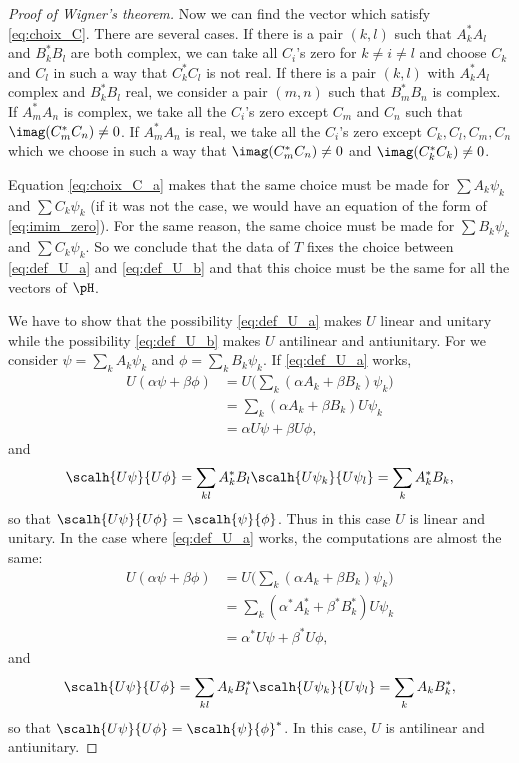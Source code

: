 \begin{proof}[Proof of Wigner's theorem]
	Now we can find the vector which satisfy \eqref{eq:choix_C}. There are several cases. If there is a pair $(k,l)$ such that $A^*_kA_l$ and $B^*_kB_l$ are both complex, we can take all $C_i$'s zero for $k\neq i\neq l$ and choose $C_k$ and $C_l$ in such a way that $C^*_kC_l$ is not real. If there is a pair $(k,l)$ with $A^*_kA_l$ complex and $B^*_kB_l$ real, we consider a pair $(m,n)$ such that $B^*_mB_n$ is complex. If $A^*_mA_n$ is complex, we take all the $C_i$'s zero except $C_m$ and $C_n$ such that $\imag(C^*_mC_n)\neq 0$. If $A^*_mA_n$ is real, we take all the $C_i$'s zero except $C_k,C_l,C_m,C_n$ which we choose in such a way that $\imag(C^*_mC_n)\neq 0$ and $\imag(C^*_kC_k)\neq 0$.

	Equation \eqref{eq:choix_C_a} makes that the same choice must be made for $\sum A_k\psi_k$ and $\sum C_k\psi_k$ (if it was not the case, we would have an equation of the form of \eqref{eq:imim_zero}). For the same reason, the same choice must be made for $\sum B_k\psi_k$ and $\sum C_k\psi_k$. So we conclude that the data of $T$ fixes the choice between \eqref{eq:def_U_a} and \eqref{eq:def_U_b} and that this choice must be the same for all the vectors of $\pH$.

	We have to show that the possibility \eqref{eq:def_U_a} makes $U$ linear and unitary while the possibility \eqref{eq:def_U_b} makes $U$ antilinear and antiunitary. For we consider $\psi=\sum_k A_k\psi_k$ and $\phi=\sum_k B_k\psi_k$. If \eqref{eq:def_U_a} works,
	\begin{equation}
		\begin{split}
			U(\alpha\psi+\beta\phi)&=U\Big(  \sum_k(\alpha A_k+\beta B_k)\psi_k     \Big)\\
			&=\sum_k(\alpha A_k+\beta B_k)U\psi_k\\
			&=\alpha U\psi+\beta U\phi,
		\end{split}
	\end{equation}
	and
	\begin{equation}
		\scalh{U\psi}{U\phi}=\sum_{kl}A^*_kB_l\scalh{U\psi_k}{U\psi_l}=\sum_kA^*_kB_k,
	\end{equation}
	so that $\scalh{U\psi}{U\phi}=\scalh{\psi}{\phi}$. Thus in this case $U$ is linear and unitary. In the case where \eqref{eq:def_U_a} works, the computations are almost the same:
	\begin{equation}
		\begin{split}
			U(\alpha\psi+\beta\phi)&=U\Big(  \sum_k(\alpha A_k+\beta B_k)\psi_k     \Big)\\
			&=\sum_k(\alpha^* A_k^*+\beta^* B^*_k)U\psi_k\\
			&=\alpha^* U\psi+\beta^* U\phi,
		\end{split}
	\end{equation}
	and
	\begin{equation}
		\scalh{U\psi}{U\phi}=\sum_{kl}A_kB^*_l\scalh{U\psi_k}{U\psi_l}=\sum_kA_kB^*_k,
	\end{equation}
	so that $\scalh{U\psi}{U\phi}=\scalh{\psi}{\phi}^*$. In this case, $U$ is antilinear and antiunitary.

\end{proof}

